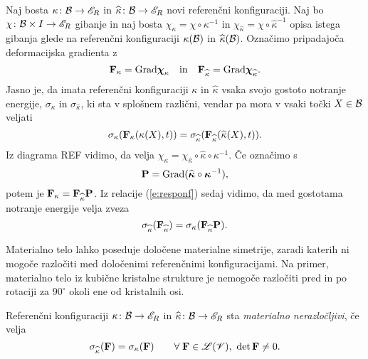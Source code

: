 Naj bosta $\kappa\colon\mathcal B\to\mathscr E_R$ in $\widehat{\kappa}\colon\mathcal B\to\mathscr E_R$ novi referenčni konfiguraciji.
Naj bo $\chi\colon\mathcal B\times I\to\mathscr E_R$ gibanje in naj bosta
$\chi_{\kappa}=\chi\circ\kappa^{-1}$ in $\chi_{\widehat{\kappa}}=\chi\circ\widehat{\kappa}^{-1}$
opisa istega gibanja glede na referenčni konfiguraciji $\kappa(\mathcal B)$ in $\widehat{\kappa}(\mathcal B)$.
Označimo pripadajoča deformacijska gradienta z
\[
	\mathbf F_{\kappa}=\mathrm{Grad}\boldsymbol \chi_{\kappa}\quad \mathrm{in}\quad
	\mathbf F_{\widehat{\kappa}}=\mathrm{Grad}\boldsymbol \chi_{\widehat{\kappa}}.
\]
Jasno je, da imata referenčni konfiguraciji $\kappa$ in $\widehat{\kappa}$ vsaka
svojo gostoto notranje energije, $\sigma_{\kappa}$ in $\sigma_{\widehat{\kappa}}$,
ki sta v splošnem različni, vendar pa mora v vsaki točki $X\in\mathcal B$ veljati
\begin{equation} \label{e:responf}
	\sigma_{\kappa}(\mathbf F_{\kappa}(\kappa(X),t))
	=\sigma_{\widehat{\kappa}}(\mathbf F_{\widehat{\kappa}}(\widehat{\kappa}(X),t)).
\end{equation}
Iz diagrama REF vidimo, da velja $\chi_{\kappa}=\chi_{\widehat{\kappa}}\circ\widehat{\kappa}\circ\kappa^{-1}$.
Če označimo s
\begin{equation} \label{e:pupa}
	\mathbf P=\mathrm{Grad}(\widehat{\boldsymbol \kappa}\circ\boldsymbol \kappa^{-1}),
\end{equation}
potem je $\mathbf F_{\kappa}=\mathbf F_{\widehat{\kappa}}\mathbf P$. Iz relacije (\ref{e:responf})
sedaj vidimo, da med gostotama notranje energije velja zveza
\begin{equation} \label{e:dolgnoc}
	\sigma_{\widehat{\kappa}}(\mathbf F_{\widehat{\kappa}})
	=\sigma_{\kappa}(\mathbf F_{\widehat{\kappa}}\mathbf P).
\end{equation}

Materialno telo lahko poseduje določene materialne simetrije, zaradi katerih ni mogoče razločiti
med določenimi referenčnimi konfiguracijami. Na primer, materialno telo iz
kubične kristalne strukture je nemogoče razločiti pred in po rotaciji za
$90^{\circ}$ okoli ene od kristalnih osi.

\begin{definicija}
	Referenčni konfiguraciji $\kappa\colon\mathcal B\to\mathscr E_R$ in $\widehat{\kappa}\colon\mathcal B\to\mathscr E_R$
	sta \emph{materialno nerazločljivi}, če velja
	\begin{equation} \label{e:grarefc}
		\sigma_{\widehat{\kappa}}(\mathbf F)=\sigma_{\kappa}(\mathbf F)
		\qquad\forall\;\mathbf F\in\mathscr L(\mathscr V),\ \det\mathbf F\neq 0.
	\end{equation}
\end{definicija}

